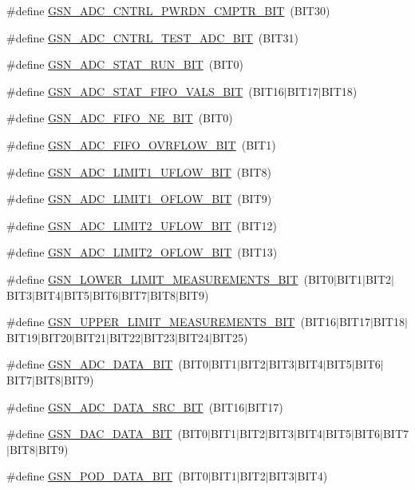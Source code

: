 \begin{DoxyCompactItemize}
\item 
\#define \hyperlink{a00546_a5489ced3c252f74878088b4c1063b94b}{GSN\_\-ADC\_\-CNTRL\_\-PWRDN\_\-CMPTR\_\-BIT}~(BIT30)
\item 
\#define \hyperlink{a00546_aab5f311c3b1d2f7dab79d1f7a990ef0d}{GSN\_\-ADC\_\-CNTRL\_\-TEST\_\-ADC\_\-BIT}~(BIT31)
\item 
\#define \hyperlink{a00546_accc431589d981464e4762f194ec74421}{GSN\_\-ADC\_\-STAT\_\-RUN\_\-BIT}~(BIT0)
\item 
\#define \hyperlink{a00546_a06d7750cdbe9227276645ae05f6ccdd7}{GSN\_\-ADC\_\-STAT\_\-FIFO\_\-VALS\_\-BIT}~(BIT16$|$BIT17$|$BIT18)
\item 
\#define \hyperlink{a00546_a4bdc9e1f68d06ab69c0d93758c5c2ed6}{GSN\_\-ADC\_\-FIFO\_\-NE\_\-BIT}~(BIT0)
\item 
\#define \hyperlink{a00546_aabf72b7a1ccd8fe6ad2eda49650f29be}{GSN\_\-ADC\_\-FIFO\_\-OVRFLOW\_\-BIT}~(BIT1)
\item 
\#define \hyperlink{a00546_a652777a67fe40e8b379590b885855d89}{GSN\_\-ADC\_\-LIMIT1\_\-UFLOW\_\-BIT}~(BIT8)
\item 
\#define \hyperlink{a00546_af57bc133fd7ee0f16319d46328d16e31}{GSN\_\-ADC\_\-LIMIT1\_\-OFLOW\_\-BIT}~(BIT9)
\item 
\#define \hyperlink{a00546_aa3eb8893fab1df2c79cb4b8a6c569732}{GSN\_\-ADC\_\-LIMIT2\_\-UFLOW\_\-BIT}~(BIT12)
\item 
\#define \hyperlink{a00546_ad5a6bba8a9b320947a75873b8fccce51}{GSN\_\-ADC\_\-LIMIT2\_\-OFLOW\_\-BIT}~(BIT13)
\item 
\#define \hyperlink{a00546_a1d8705153359bf571afdaa293740597e}{GSN\_\-LOWER\_\-LIMIT\_\-MEASUREMENTS\_\-BIT}~(BIT0$|$BIT1$|$BIT2$|$BIT3$|$BIT4$|$BIT5$|$BIT6$|$BIT7$|$BIT8$|$BIT9)
\item 
\#define \hyperlink{a00546_a02e5833c26e7cf8f45321ed3d9886133}{GSN\_\-UPPER\_\-LIMIT\_\-MEASUREMENTS\_\-BIT}~(BIT16$|$BIT17$|$BIT18$|$BIT19$|$BIT20$|$BIT21$|$BIT22$|$BIT23$|$BIT24$|$BIT25)
\item 
\#define \hyperlink{a00546_aca0bee2cec66890da6f7a254341d5b25}{GSN\_\-ADC\_\-DATA\_\-BIT}~(BIT0$|$BIT1$|$BIT2$|$BIT3$|$BIT4$|$BIT5$|$BIT6$|$BIT7$|$BIT8$|$BIT9)
\item 
\#define \hyperlink{a00546_a3d8d67e6f614ba0e4932e0901848264c}{GSN\_\-ADC\_\-DATA\_\-SRC\_\-BIT}~(BIT16$|$BIT17)
\item 
\#define \hyperlink{a00546_a4950e1eefe2da791fc9c23c7e3d32dc5}{GSN\_\-DAC\_\-DATA\_\-BIT}~(BIT0$|$BIT1$|$BIT2$|$BIT3$|$BIT4$|$BIT5$|$BIT6$|$BIT7$|$BIT8$|$BIT9)
\item 
\#define \hyperlink{a00546_ae7b26dd2ab238ec9f247824653e9ce63}{GSN\_\-POD\_\-DATA\_\-BIT}~(BIT0$|$BIT1$|$BIT2$|$BIT3$|$BIT4)
\end{DoxyCompactItemize}


